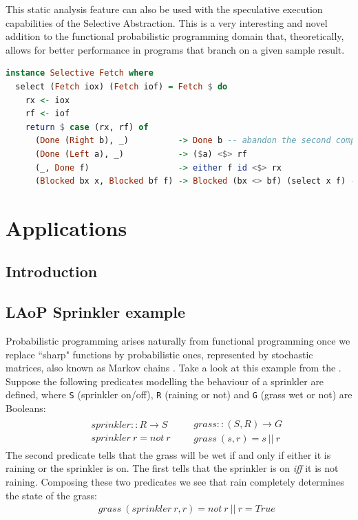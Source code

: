 \documentclass[
  oneside,
  11pt, a4paper,
  footinclude=true,
  headinclude=true,
  cleardoublepage=empty
]{scrbook}
\theoremstyle{definition}
\theoremstyle{definition}
\def\start{&&}
\def\more{\\&&}
\begin{document}
This static analysis feature can also be used with the speculative execution capabilities of the Selective Abstraction. This is a very interesting and novel addition to the functional probabilistic programming domain that, theoretically, allows for better performance in programs that branch on a given sample result.

    \begin{lstlisting}[language=Haskell, caption={Fetch Selective instance},captionpos=b]
instance Selective Fetch where
  select (Fetch iox) (Fetch iof) = Fetch $ do
    rx <- iox
    rf <- iof
    return $ case (rx, rf) of
      (Done (Right b), _)          -> Done b -- abandon the second computation
      (Done (Left a), _)           -> ($a) <$> rf
      (_, Done f)                  -> either f id <$> rx
      (Blocked bx x, Blocked bf f) -> Blocked (bx <> bf) (select x f) -- speculative execution
    \end{lstlisting}
    
    \chapter{Applications}\label{ch-applications}
    
        \section{Introduction}
        
        \section{LAoP Sprinkler example}
        
        Probabilistic programming arises naturally from functional programming once we replace ``sharp" functions by probabilistic ones, represented by stochastic matrices, also known as Markov chains \cite{oliveira2012towards}. Take a look at this example from the \citet{wiki:BayesianNetwork}. Suppose the following predicates modelling the behaviour of a sprinkler are defined, where \texttt{S} (sprinkler on/off), \texttt{R} (raining or not) and \texttt{G} (grass wet or not) are Booleans:
        \begin{eqnarray*}
        \begin{array}{rcl}
        \start sprinkler :: R \to S
        \more sprinkler\ r = not\ r
        \end{array}
        \begin{array}{rcl}
        \start grass :: (S, R) \to G
        \more grass\ (s,r) = s\ ||\ r
        \end{array}
        \end{eqnarray*}
        The second predicate tells that the grass will be wet if and only if either it is raining or the sprinkler is on. The first tells that the sprinkler is on \emph{iff} it is not raining. Composing these two predicates we see that rain completely determines the state of the grass:
        \begin{eqnarray*}
        \start grass\ (sprinkler\ r,r) = not\ r\ ||\ r = True
        \end{eqnarray*}
        
\end{document}
